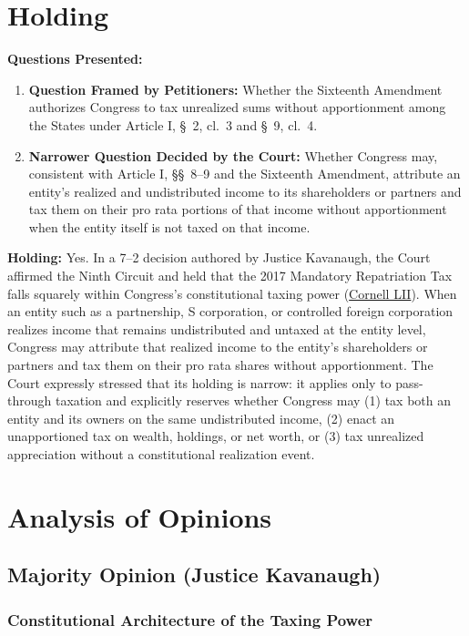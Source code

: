 \documentclass[12pt]{article}
\begin{document}
\section{Holding}
\textbf{Questions Presented:}

\begin{enumerate}
  \item \textbf{Question Framed by Petitioners:} Whether the Sixteenth Amendment authorizes Congress to tax unrealized sums without apportionment among the States under Article I, \S\ 2, cl.\ 3 and \S\ 9, cl.\ 4.
  \item \textbf{Narrower Question Decided by the Court:} Whether Congress may, consistent with Article I, \S\S\ 8--9 and the Sixteenth Amendment, attribute an entity's realized and undistributed income to its shareholders or partners and tax them on their pro rata portions of that income without apportionment when the entity itself is not taxed on that income.
\end{enumerate}

\textbf{Holding:} Yes. In a 7--2 decision authored by Justice Kavanaugh, the Court affirmed the Ninth Circuit and held that the 2017 Mandatory Repatriation Tax falls squarely within Congress's constitutional taxing power (\href{https://www.law.cornell.edu/supremecourt/text/22-800_2024-06-20}{Cornell LII}). When an entity such as a partnership, S corporation, or controlled foreign corporation realizes income that remains undistributed and untaxed at the entity level, Congress may attribute that realized income to the entity's shareholders or partners and tax them on their pro rata shares without apportionment. The Court expressly stressed that its holding is narrow: it applies only to pass-through taxation and explicitly reserves whether Congress may (1) tax both an entity and its owners on the same undistributed income, (2) enact an unapportioned tax on wealth, holdings, or net worth, or (3) tax unrealized appreciation without a constitutional realization event.

\section{Analysis of Opinions}
\subsection{Majority Opinion (Justice Kavanaugh)}

\subsubsection{Constitutional Architecture of the Taxing Power}
\end{document}
